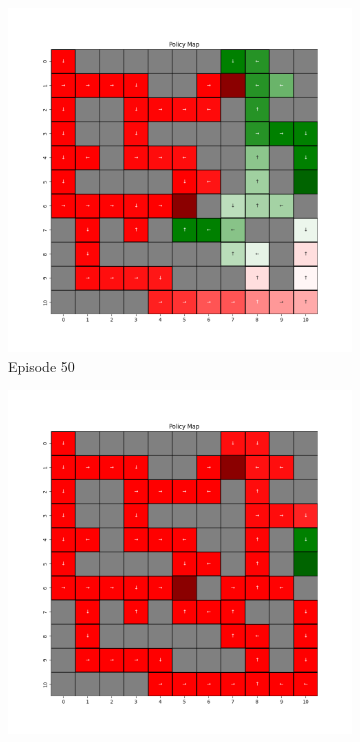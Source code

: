 \documentclass{assignment}
\begin{document}
\begin{figure}[H]
\begin{subfigure}{0.3\textwidth}
        \includegraphics[width=\textwidth]{figures/policy_q/gamma_sweep/policy_alpha_0.1_gamma_0.25_epsilon_0.2_iteration_50.png}
    \caption{Episode 50}
    \end{subfigure}\hfill
    \begin{subfigure}{0.3\textwidth}
        \includegraphics[width=\textwidth]{figures/policy_q/gamma_sweep/policy_alpha_0.1_gamma_0.25_epsilon_0.2_iteration_100.png}

\end{subfigure}
\end{figure}
\end{document}
